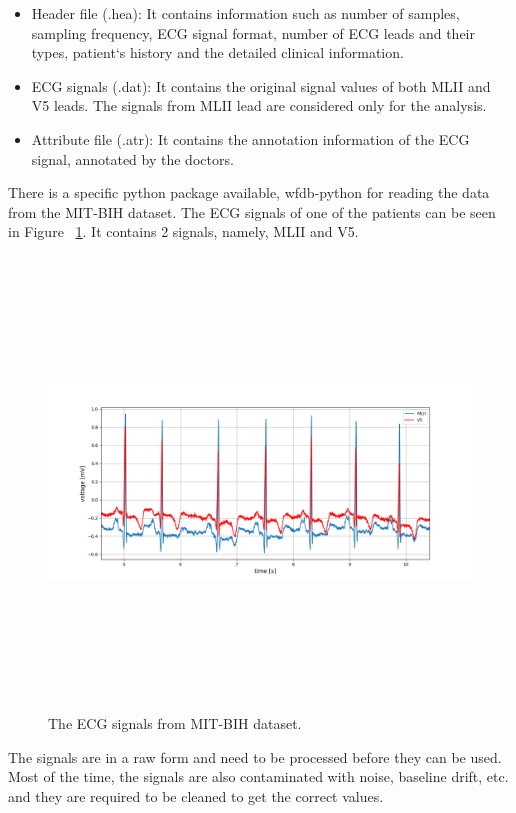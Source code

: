\begin{itemize}
	\item Header file (.hea): It contains information such as number of samples, sampling frequency, ECG signal format, number of ECG leads and their types, patient`s history and the detailed clinical information.
	
	\item ECG signals (.dat): It contains the original signal values of both MLII and V5 leads. The signals from MLII lead are considered only for the analysis.
	
	\item Attribute file (.atr): It contains the annotation information of the ECG signal, annotated by the doctors.
\end{itemize}

There is a specific python package available, wfdb-python for reading the data from the MIT-BIH dataset. The ECG signals of one of the patients can be seen in Figure ~\ref{fig:all_signals}. It contains 2 signals, namely, MLII and V5.


\begin{figure}[h]
	\centering
	\includegraphics[width=15cm,height=12cm,keepaspectratio=true]{images/all_signals}
	\caption{
		The ECG signals from MIT-BIH dataset.
	}
	\label{fig:all_signals}
\end{figure}


The signals are in a raw form and need to be processed before they can be used. Most of the time, the signals are also contaminated with noise, baseline drift, etc. and they are required to be cleaned to get the correct values. 


